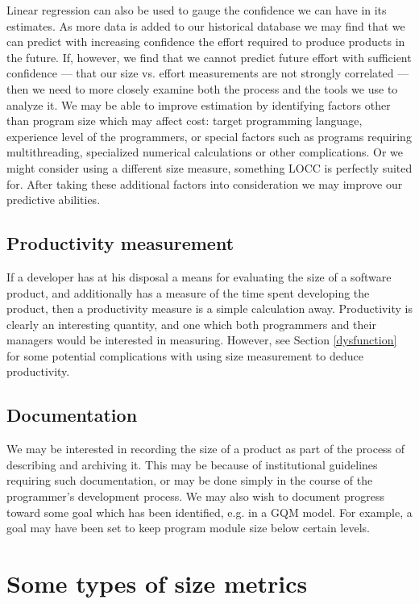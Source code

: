 Linear regression can also be used to gauge the
confidence we can have in its estimates.  As more
data is added to our historical database we may find that we can predict with
increasing confidence the effort required to produce products in the
future.  If, however, we find that we cannot predict future effort
with sufficient confidence --- that our size vs. effort measurements
are not strongly correlated --- then we need to more closely examine both the
process and the tools we use to analyze it.  We may be able to improve
estimation  by identifying factors other than program size which may affect 
cost: target programming language, experience level of the
programmers, or special factors such as programs requiring
multithreading, specialized numerical calculations or other
complications.  Or we might consider using a different size measure,
something LOCC is perfectly suited for.  After taking these additional
factors into 
consideration we may improve our predictive abilities.

\subsection{Productivity measurement}

If a developer has at his disposal a means for evaluating the size of a
software product, and additionally has a measure of the time spent
developing the product, then a productivity measure is a simple
calculation away.  Productivity is clearly an interesting quantity,
and one which both programmers and their managers would be
interested in measuring.  However, see Section \ref{dysfunction} for
some potential complications with using size measurement to deduce
productivity. 

\subsection{Documentation}

We may be interested in recording the size of a product as part of the
process of describing and archiving it.  This may be because of
institutional guidelines requiring such documentation, or may be done
simply in the course of the programmer's development process.  We may
also wish to document progress toward some goal which has been
identified, e.g. in a GQM \cite{Humphrey} model.  For example, a goal
may have been set to keep program module size below certain levels. 


\section{Some types of size metrics}


